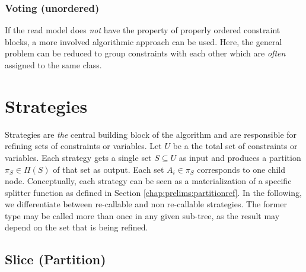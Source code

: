 			\subsubsection{Voting (unordered)}
			\label{chap:tree:classifiers:cooccurence}
			
				If the read model does \textit{not} have the property of properly ordered constraint blocks, a more involved algorithmic approach can be used.
				Here, the general problem can be reduced to group constraints with each other which are \textit{often} assigned to the same class. 
					
				\clearpage
		
%	
%			
		
	\section{Strategies}
	\label{chap:tree:strategies}
	
		Strategies are \textit{the} central building block of the algorithm and are responsible for refining sets of constraints or variables.
		Let $U$ be a the total set of constraints or variables.
		Each strategy gets a single set $S \subseteq U$ as input and produces a partition $\pi_S \in \Pi(S)$ of that set as output.
		Each set $A_i \in \pi_S$ corresponds to one child node.
		Conceptually, each strategy can be seen as a materialization of a specific splitter function as defined in Section \ref{chap:prelims:partitionref}.
		In the following, we differentiate between re-callable and non re-callable strategies. The former type may be called more than once in any given sub-tree, as the result may depend on the set that is being refined.
		
		\clearpage
	
		\subsection{Slice (Partition)}
		\label{chap:tree:strategies:slice:part}
		
